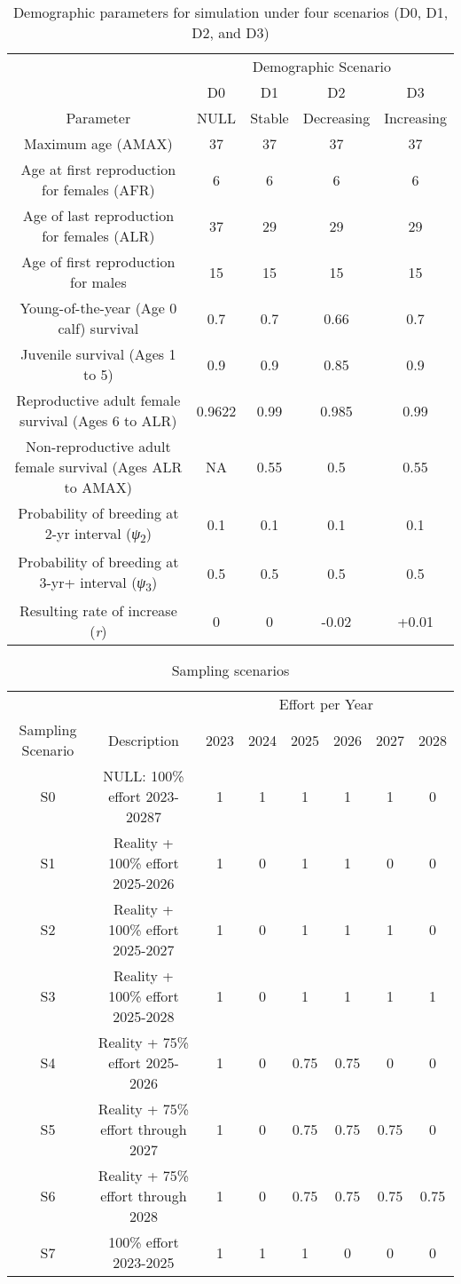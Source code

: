 \begin{table}
\caption{Demographic parameters for simulation under four scenarios (D0, D1,
D2, and D3)\label{tab:demo-pars}}

\begin{tabular}{ccccc}
 & \multicolumn{4}{c}{Demographic Scenario}\tabularnewline
\cline{2-5}
 & D0 & D1 & D2 & D3\tabularnewline
Parameter & NULL & Stable & Decreasing & Increasing\tabularnewline
\hline 
Maximum age (AMAX) & 37 & 37 & 37 & 37\tabularnewline
Age at first reproduction for females (AFR) & 6 & 6 & 6 & 6\tabularnewline
Age of last reproduction for females (ALR) & 37 & 29 & 29 & 29\tabularnewline
Age of first reproduction for males & 15 & 15 & 15 & 15\tabularnewline
Young-of-the-year (Age 0 calf) survival & 0.7 & 0.7 & 0.66 & 0.7\tabularnewline
Juvenile survival (Ages 1 to 5) & 0.9 & 0.9 & 0.85 & 0.9\tabularnewline
Reproductive adult female survival (Ages 6 to ALR) & 0.9622 & 0.99 & 0.985 & 0.99\tabularnewline
Non-reproductive adult female survival (Ages ALR to AMAX) & NA & 0.55 & 0.5 & 0.55\tabularnewline
Probability of breeding at 2-yr interval (\emph{\textgreek{ψ}}\textsubscript{2}) & 0.1 & 0.1 & 0.1 & 0.1\tabularnewline
Probability of breeding at 3-yr+ interval (\emph{\textgreek{ψ}}\textsubscript{3}) & 0.5 & 0.5 & 0.5 & 0.5\tabularnewline
Resulting rate of increase (\emph{r}) & 0 & 0 & -0.02 & +0.01\tabularnewline
\end{tabular}
\end{table}
\begin{table}
\caption{Sampling scenarios\label{tab:Sampling-scenarios}}

\begin{tabular}{cccccccc}
 &  & \multicolumn{6}{c}{Effort per Year}\tabularnewline
\cline{3-8}
Sampling Scenario & Description & 2023 & 2024 & 2025 & 2026 & 2027 & 2028\tabularnewline
\hline 
S0 & NULL: 100\% effort 2023-20287 & 1 & 1 & 1 & 1 & 1 & 0\tabularnewline
S1 & Reality + 100\% effort 2025-2026 & 1 & 0 & 1 & 1 & 0 & 0\tabularnewline
S2 & Reality + 100\% effort 2025-2027 & 1 & 0 & 1 & 1 & 1 & 0\tabularnewline
S3 & Reality + 100\% effort 2025-2028 & 1 & 0 & 1 & 1 & 1 & 1\tabularnewline
S4 & Reality + 75\% effort 2025-2026 & 1 & 0 & 0.75 & 0.75 & 0 & 0\tabularnewline
S5 & Reality + 75\% effort through 2027 & 1 & 0 & 0.75 & 0.75 & 0.75 & 0\tabularnewline
S6 & Reality + 75\% effort through 2028 & 1 & 0 & 0.75 & 0.75 & 0.75 & 0.75\tabularnewline
S7 & 100\% effort 2023-2025 & 1 & 1 & 1 & 0 & 0 & 0\tabularnewline
\end{tabular}
\end{table}


